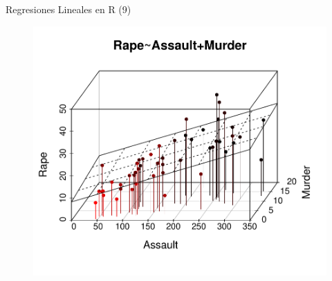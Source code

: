\documentclass[handout]{beamer}
\begin{document}
\begin{frame}{Regresiones Lineales en R (9)}
 
\begin{figure}[h!]
	\centering
	\includegraphics[scale=0.6]{pics/reg3d.pdf}
\end{figure}
 
\end{frame}
\end{document}
